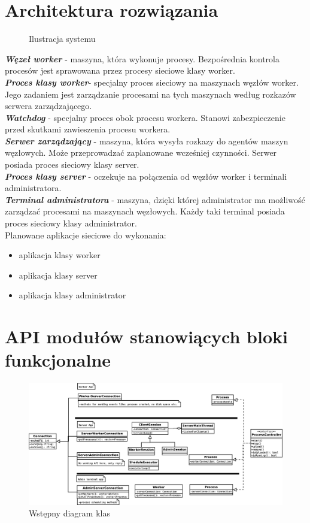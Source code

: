 \documentclass[paper=a4, fontsize=11pt]{scrartcl} %
\begin{document}
\section*{Architektura rozwiązania}
\begin{figure}[H]
    \centering
    \def\svgwidth{0.5\columnwidth}
    
    \caption{Ilustracja systemu}\label{visina8}
\end{figure}
\textbf{\textit{Węzeł worker}} - maszyna, która wykonuje procesy. Bezpośrednia kontrola procesów jest sprawowana przez procesy sieciowe klasy worker.\\
\textbf{\textit{Proces klasy worker}}- specjalny proces sieciowy na maszynach węzłów worker. Jego zadaniem jest zarządzanie procesami na tych maszynach według rozkazów serwera zarządzającego.\\
\textbf{\textit{Watchdog}} - specjalny proces obok procesu workera. Stanowi zabezpieczenie przed skutkami zawieszenia procesu workera. \\
\textbf{\textit{Serwer zarządzający}} - maszyna, która wysyła rozkazy do agentów maszyn węzłowych. Może przeprowadzać zaplanowane wcześniej czynności. Serwer posiada proces sieciowy klasy server.\\
\textbf{\textit{Proces klasy server}} - oczekuje na połączenia od węzłów worker i terminali administratora.\\
\textbf{\textit{Terminal administratora}} - maszyna, dzięki której administrator ma możliwość zarządzać procesami na maszynach węzłowych. Każdy taki terminal posiada proces sieciowy klasy administrator.\\

Planowane aplikacje sieciowe do wykonania:
\begin{itemize}
\item aplikacja klasy worker
\item aplikacja klasy server
\item aplikacja klasy administrator
\end{itemize}

\section*{API modułów stanowiących bloki funkcjonalne}
\begin{figure}[H]
	\centering
	\includegraphics[scale=.25]{tin.eps}
	\caption{Wstępny diagram klas}
\end{figure}
\end{document}
